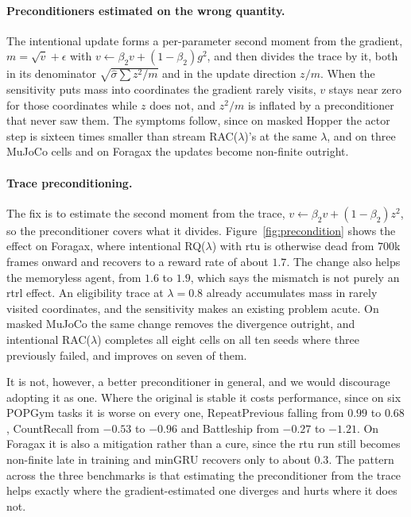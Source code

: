 \documentclass{article}
\begin{document}
\paragraph{Preconditioners estimated on the wrong quantity.} The intentional update forms a
per-parameter second moment from the gradient, $m = \sqrt{\hat{v}} + \epsilon$ with
$v \leftarrow \beta_2 v + (1-\beta_2) g^2$, and then divides the trace by it, both in its
denominator $\sqrt{\hat{\sigma}\sum z^2/m}$ and in the update direction $z/m$. When the
sensitivity puts mass into coordinates the gradient rarely visits, $v$ stays near zero for
those coordinates while $z$ does not, and $z^2/m$ is inflated by a preconditioner that never
saw them. The symptoms follow, since on masked Hopper the actor step is sixteen times smaller than
stream RAC($\lambda$)'s at the same $\lambda$, and on three MuJoCo cells and on Foragax the
updates become non-finite outright.

\paragraph{Trace preconditioning.} The fix is to estimate the second moment from the trace,
$v \leftarrow \beta_2 v + (1-\beta_2) z^2$, so the preconditioner covers what it divides.
Figure~\ref{fig:precondition} shows the effect on Foragax, where intentional RQ($\lambda$)
with \gls{rtu} is otherwise dead from $700$k frames onward and recovers to a reward rate of
about $1.7$. The change also helps the memoryless agent, from $1.6$ to $1.9$, which says the
mismatch is not purely an \gls{rtrl} effect. An eligibility trace at $\lambda = 0.8$ already
accumulates mass in rarely visited coordinates, and the sensitivity makes an existing problem
acute. On masked MuJoCo the same change removes the divergence outright, and intentional RAC($\lambda$)
completes all eight cells on all ten seeds where three previously failed, and improves on seven
of them.

It is not, however, a better preconditioner in general, and we would discourage adopting it as
one. Where the original is stable it costs performance, since on six POPGym tasks it is worse on every
one, RepeatPrevious falling from $0.99$ to $0.68$, CountRecall from $-0.53$ to $-0.96$ and
Battleship from $-0.27$ to $-1.21$. On Foragax it is also a mitigation rather than a cure, since
the \gls{rtu} run still becomes non-finite late in training and minGRU recovers only to about
$0.3$. The pattern across the three benchmarks is that estimating the preconditioner from the
trace helps exactly where the gradient-estimated one diverges and hurts where it does not.
\end{document}
